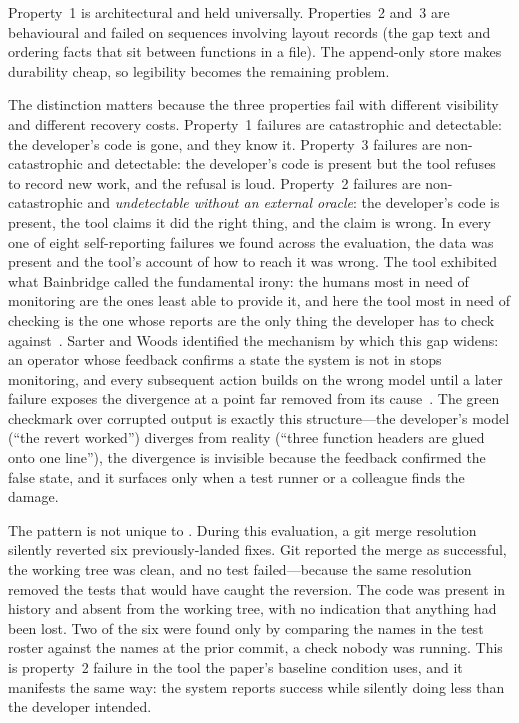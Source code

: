 Property~1 is architectural and held universally. Properties~2 and~3 are
behavioural and failed on sequences involving layout records (the gap text
and ordering facts that sit between functions in a file). The append-only store
makes durability cheap, so legibility becomes the remaining problem.

The distinction matters because the three properties fail with different
visibility and different recovery costs. Property~1 failures are catastrophic
and detectable: the developer's code is gone, and they know it. Property~3
failures are non-catastrophic and detectable: the developer's code is present
but the tool refuses to record new work, and the refusal is loud. Property~2
failures are non-catastrophic and \emph{undetectable without an external oracle}:
the developer's code is present, the tool claims it did the right thing, and the
claim is wrong. In every one of eight self-reporting failures we found across the
evaluation, the data was present and the tool's account of how to reach it was
wrong. The tool exhibited what Bainbridge called the fundamental irony: the
humans most in need of monitoring are the ones least able to provide it, and here
the tool most in need of checking is the one whose reports are the only thing the
developer has to check against~\cite{bainbridge1983}. Sarter and Woods identified
the mechanism by which this gap widens: an operator whose feedback confirms a
state the system is not in stops monitoring, and every subsequent action builds on
the wrong model until a later failure exposes the divergence at a point far removed
from its cause~\cite{sarter1995}. The green checkmark over corrupted output is
exactly this structure---the developer's model (``the revert worked'') diverges from
reality (``three function headers are glued onto one line''), the divergence is
invisible because the feedback confirmed the false state, and it surfaces only when
a test runner or a colleague finds the damage.

The pattern is not unique to \sgt{}. During this evaluation, a git merge
resolution silently reverted six previously-landed fixes. Git reported the merge
as successful, the working tree was clean, and no test failed---because the same
resolution removed the tests that would have caught the reversion. The code was
present in history and absent from the working tree, with no indication that
anything had been lost. Two of the six were found only by comparing the names
in the test roster against the names at the prior commit, a check nobody was
running. This is property~2 failure in the tool the paper's baseline condition
uses, and it manifests the same way: the system reports success while silently
doing less than the developer intended.

